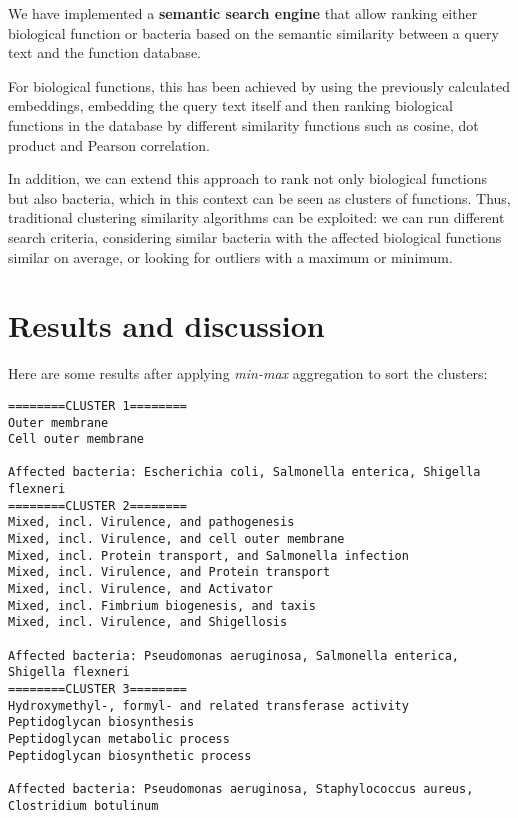 \documentclass{article}
\begin{document}
We have implemented a \textbf{semantic search engine} that allow ranking either biological function or bacteria based on the semantic similarity between a query text and the function database. 

For biological functions, this has been achieved by using the previously calculated embeddings, embedding the query text itself and then ranking biological functions in the database by different similarity functions such as cosine, dot product and Pearson correlation.

In addition, we can extend this approach to rank not only biological functions but also bacteria, which in this context can be seen as clusters of functions. Thus, traditional clustering similarity algorithms can be exploited: we can run different search criteria, considering similar bacteria with the affected biological functions similar on average, or looking for outliers with a maximum or minimum.

\section{Results and discussion}
Here are some results after applying \textit{min-max} aggregation to sort the clusters:
\begin{verbatim}
========CLUSTER 1========
Outer membrane
Cell outer membrane

Affected bacteria: Escherichia coli, Salmonella enterica, Shigella flexneri
========CLUSTER 2========
Mixed, incl. Virulence, and pathogenesis
Mixed, incl. Virulence, and cell outer membrane
Mixed, incl. Protein transport, and Salmonella infection
Mixed, incl. Virulence, and Protein transport
Mixed, incl. Virulence, and Activator
Mixed, incl. Fimbrium biogenesis, and taxis
Mixed, incl. Virulence, and Shigellosis

Affected bacteria: Pseudomonas aeruginosa, Salmonella enterica, Shigella flexneri
========CLUSTER 3========
Hydroxymethyl-, formyl- and related transferase activity
Peptidoglycan biosynthesis
Peptidoglycan metabolic process
Peptidoglycan biosynthetic process

Affected bacteria: Pseudomonas aeruginosa, Staphylococcus aureus, Clostridium botulinum
\end{verbatim}
\end{document}
